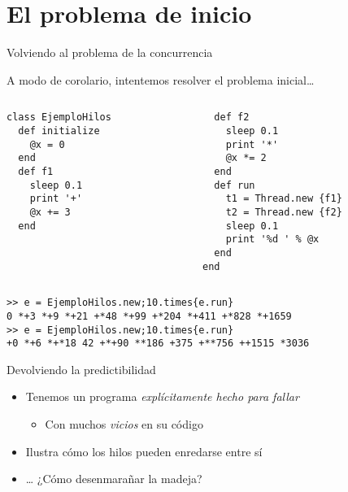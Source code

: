 \documentclass[presentation]{beamer}
\begin{document}
\section{El problema de inicio}
\label{sec:orgcc14eee}
\begin{frame}[label={sec:org74e5c29},fragile]{Volviendo al problema de la concurrencia}
 \begin{center}
A modo de corolario, intentemos resolver el problema inicial\ldots{}
\end{center}
\begin{columns}\begin{column}{0.5\textwidth}
\begin{verbatim}
class EjemploHilos
  def initialize
    @x = 0
  end
  def f1
    sleep 0.1
    print '+'
    @x += 3
  end
\end{verbatim}
\end{column} \begin{column}{0.5\textwidth}
\begin{verbatim}
  def f2
    sleep 0.1
    print '*'
    @x *= 2
  end
  def run
    t1 = Thread.new {f1}
    t2 = Thread.new {f2}
    sleep 0.1
    print '%d ' % @x
  end
end
\end{verbatim}
\end{column}\end{columns}
\begin{verbatim}
>> e = EjemploHilos.new;10.times{e.run}
0 *+3 *+9 *+21 +*48 *+99 +*204 *+411 +*828 *+1659
>> e = EjemploHilos.new;10.times{e.run}
+0 *+6 *+*18 42 +*+90 **186 +375 +**756 ++1515 *3036
\end{verbatim}
\end{frame}

\begin{frame}[label={sec:org0ebd50a}]{Devolviendo la predictibilidad}
\begin{itemize}
\item Tenemos un programa \emph{explícitamente hecho para fallar}
\begin{itemize}
\item Con muchos \emph{vicios} en su código
\end{itemize}
\item Ilustra cómo los hilos pueden enredarse entre sí
\item \ldots{} ¿Cómo desenmarañar la madeja?
\end{itemize}
\end{frame}
\end{document}
